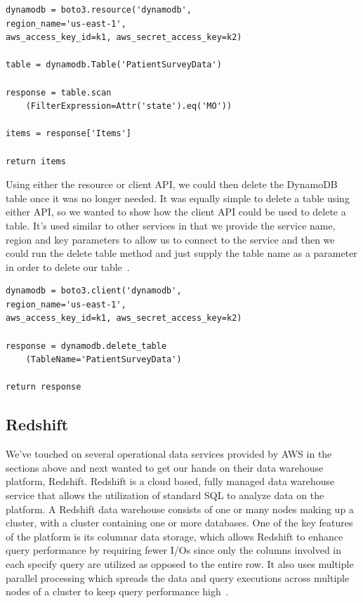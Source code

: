 \begin{verbatim}
dynamodb = boto3.resource('dynamodb', 
region_name='us-east-1', 
aws_access_key_id=k1, aws_secret_access_key=k2)

table = dynamodb.Table('PatientSurveyData')

response = table.scan
	(FilterExpression=Attr('state').eq('MO'))

items = response['Items']

return items
\end{verbatim}

Using either the resource or client API, we could then delete the DynamoDB 
table once it was no longer needed. It was equally simple to delete a table 
using either API, so we wanted to show how the client API could be used to 
delete a table. It's used similar to other services in that we provide the 
service name, region and key parameters to allow us to connect to the service 
and then we could run the delete table method and just supply the table name 
as a parameter in order to delete our table~\cite{hid-sp18-521-botodynamodb}.  

\begin{verbatim}
dynamodb = boto3.client('dynamodb', 
region_name='us-east-1', 
aws_access_key_id=k1, aws_secret_access_key=k2)

response = dynamodb.delete_table
	(TableName='PatientSurveyData')

return response
\end{verbatim}	

\subsection{Redshift}

We've touched on several operational data services provided by AWS in the 
sections above and next wanted to get our hands on their data warehouse 
platform, Redshift. Redshift is a cloud based, fully managed data warehouse 
service that allows the utilization of standard SQL to analyze data on the 
platform. A Redshift data warehouse consists of one or many nodes making up a 
cluster, with a cluster containing one or more databases. One of the key 
features of the platform is its columnar data storage, which allows Redshift 
to enhance query performance by requiring fewer I/Os since only the columns 
involved in each specify query are utilized as opposed to the entire row. 
It also uses multiple parallel processing which spreads the data and query 
executions across multiple nodes of a cluster to keep query performance 
high~\cite{hid-sp18-521-redshift-gettingstarted}. 

